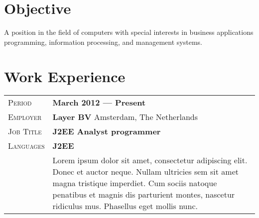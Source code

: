 \documentclass[a4paper, oneside, final]{scrartcl} %
\newcommand{\gray}{\rowcolor[gray]{.90}} %
\begin{document}
\begin{center} %


{\fontsize{36}{36}\selectfont\scshape{}} %

\vspace{1.5cm} %


\section{Objective}

A position in the field of computers with special interests in business applications \\ programming, information processing, and management systems.


\section{Work Experience}

\begin{tabularx}{0.97\linewidth}{>{\raggedleft\scshape}p{2cm}X}
\gray Period & \textbf{March 2012 --- Present}\\
\gray Employer & \textbf{Layer BV} \hfill Amsterdam, The Netherlands\\
\gray Job Title & \textbf{J2EE Analyst programmer}\\
\gray Languages & \textbf{J2EE}\\
       & Lorem ipsum dolor sit amet, consectetur adipiscing elit. Donec et auctor neque. Nullam ultricies sem sit amet magna tristique imperdiet. Cum sociis natoque penatibus et magnis dis parturient montes, nascetur ridiculus mus. Phasellus eget mollis nunc.
\end{tabularx}


\end{center}
\end{document}
